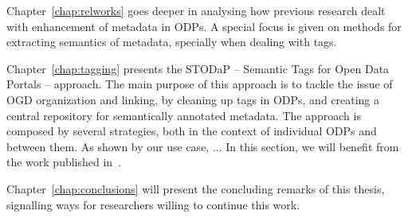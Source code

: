 Chapter~\ref{chap:relworks} goes deeper in analysing how previous research dealt with enhancement of metadata in ODPs.
A special focus is given on methods for extracting semantics of metadata, specially when dealing with tags.

Chapter~\ref{chap:tagging} presents the STODaP -- Semantic Tags for Open Data Portals -- approach.
The main purpose of this approach is to tackle the issue of OGD organization and linking, by cleaning up tags in ODPs, and creating a central repository for semantically annotated metadata.
The approach is composed by several strategies, both in the context of individual ODPs and between them.
As shown by our use case, ...
In this section, we will benefit from the work published in~.

Chapter~\ref{chap:conclusions} will present the concluding remarks of this thesis, signalling ways for researchers willing to continue this work.
